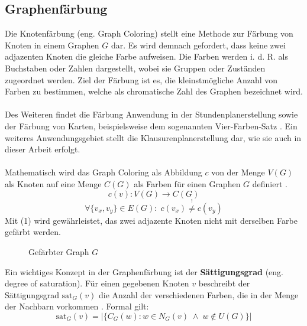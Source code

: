 \subsection{Graphenfärbung}
Die Knotenfärbung (\acrshort{eng.} Graph Coloring) stellt eine Methode zur Färbung von Knoten in einem Graphen $G$ dar. 
Es wird demnach gefordert, dass keine zwei adjazenten Knoten die gleiche Farbe aufweisen.
Die Farben werden \acrshort{i. d. R.} als Buchstaben oder Zahlen dargestellt, wobei sie Gruppen oder Zuständen zugeordnet werden.
Ziel der Färbung ist es, die kleinstmögliche Anzahl von Farben zu bestimmen, welche als chromatische Zahl des Graphen bezeichnet wird.\\\\
Des Weiteren findet die Färbung Anwendung in der Stundenplanerstellung \parencite[1]{lewis2021guide} sowie der Färbung von Karten, beispielsweise dem sogenannten Vier-Farben-Satz \parencite[7-9]{lewis2021guide}.
Ein weiteres Anwendungsgebiet stellt die Klausurenplanerstellung dar, wie sie auch in dieser Arbeit erfolgt.\\\\
\newpage
\noindent Mathematisch wird das Graph Coloring als Abbildung $c$ von der Menge $V(G)$ als Knoten auf eine Menge $C(G)$ als Farben für einen Graphen $G$ definiert \parencite[121]{Diestel2017-bj}.
\begin{equation*}
c(v): V(G) \rightarrow C(G)
\end{equation*}
\begin{equation}
\forall \{v_x,v_y\} \in E(G) \colon \; c(v_x) \overset{!}{\neq} c(v_y)
\end{equation}
Mit (1) wird gewährleistet, das zwei adjazente Knoten nicht mit derselben Farbe gefärbt werden.
\vspace{-2.25cm}
\begin{figure}[H]
    \centering
    
    \vspace{-2cm}
    \caption{Gefärbter Graph $G$}
\end{figure}
\noindent Ein wichtiges Konzept in der Graphenfärbung ist der \textbf{Sättigungsgrad} (\acrshort{eng.} degree of saturation). 
Für einen gegebenen Knoten $v$ beschreibt der Sättigungsgrad $\text{sat}_G(v)$ die Anzahl der verschiedenen Farben, die in der Menge der Nachbarn vorkommen \parencite[39]{lewis2021guide}. Formal gilt: 
\begin{equation*}
    \text{sat}_G(v)=|\{C_G(w)\colon w \in N_G(v) \; \wedge \; w \notin U(G)\}|
\end{equation*}

